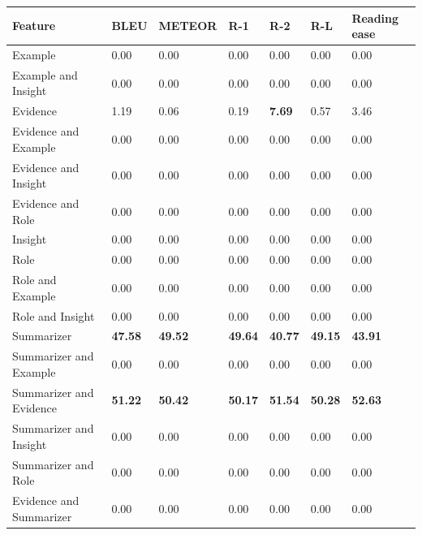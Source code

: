 \begin{tabular}{|l|l|l|l|l|l|l|}
\hline
\textbf{Feature} & BLEU & METEOR & R-1 & R-2 & R-L & Reading ease \\
 \hline
 Example & 0.00 & 0.00 & 0.00 & 0.00 & 0.00 & 0.00 \\
 \hline
 Example and Insight & 0.00 & 0.00 & 0.00 & 0.00 & 0.00 & 0.00 \\
 \hline
 Evidence & 1.19 & 0.06 & 0.19 & \textbf{7.69} & 0.57 & 3.46 \\
 \hline
 Evidence and Example & 0.00 & 0.00 & 0.00 & 0.00 & 0.00 & 0.00 \\
 \hline
 Evidence and Insight & 0.00 & 0.00 & 0.00 & 0.00 & 0.00 & 0.00 \\
 \hline
 Evidence and Role & 0.00 & 0.00 & 0.00 & 0.00 & 0.00 & 0.00 \\
 \hline
 Insight & 0.00 & 0.00 & 0.00 & 0.00 & 0.00 & 0.00 \\
 \hline
 Role & 0.00 & 0.00 & 0.00 & 0.00 & 0.00 & 0.00 \\
 \hline
 Role and Example & 0.00 & 0.00 & 0.00 & 0.00 & 0.00 & 0.00 \\
 \hline
 Role and Insight & 0.00 & 0.00 & 0.00 & 0.00 & 0.00 & 0.00 \\
 \hline
 Summarizer & \textbf{47.58} & \textbf{49.52} & \textbf{49.64} & \textbf{40.77} & \textbf{49.15} & \textbf{43.91} \\
 \hline
 Summarizer and Example & 0.00 & 0.00 & 0.00 & 0.00 & 0.00 & 0.00 \\
 \hline
 Summarizer and Evidence & \textbf{51.22} & \textbf{50.42} & \textbf{50.17} & \textbf{51.54} & \textbf{50.28} & \textbf{52.63} \\
 \hline
 Summarizer and Insight & 0.00 & 0.00 & 0.00 & 0.00 & 0.00 & 0.00 \\
 \hline
 Summarizer and Role & 0.00 & 0.00 & 0.00 & 0.00 & 0.00 & 0.00 \\
 \hline
 Evidence and Summarizer & 0.00 & 0.00 & 0.00 & 0.00 & 0.00 & 0.00 \\
\hline
\end{tabular}
